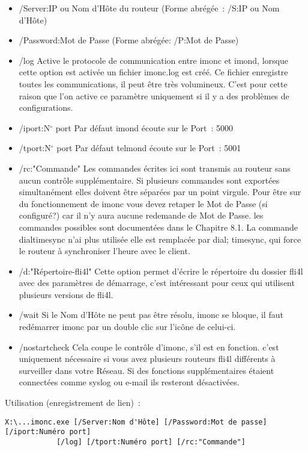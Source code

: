   \begin{itemize}
    \item /Server:IP ou Nom d'Hôte du routeur (Forme abrégée~: /S:IP ou Nom d'Hôte)
    \item /Password:Mot de Passe (Forme abrégée: /P:Mot de Passe)
    \item /log Active le protocole de communication entre imonc et imond, lorsque
      cette option est activée un fichier imonc.log est créé. Ce fichier enregistre
      toutes les communications, il peut être très volumineux. C'est pour cette
      raison que l'on active ce paramètre uniquement si il y a des problèmes de
      configurations.
    \item /iport:N$^\circ$ port Par défaut imond écoute sur le Port~: 5000
    \item /tport:N$^\circ$ port Par défaut telmond écoute sur le Port~: 5001
    \item /rc:"Commande" Les commandes écrites ici sont transmis au routeur sans
      aucun contrôle supplémentaire. Si plusieurs commandes sont exportées
      simultanément elles doivent être séparées par un point virgule. Pour être
      sur du fonctionnement de imonc vous devez retaper le Mot de Passe
      (si configuré?) car il n'y aura aucune redemande de Mot de Passe.
      les commandes possibles sont documentées dans le Chapitre 8.1. La commande
      dialtimesync n'ai plus utilisée elle est remplacée par \flqq{}dial; timesync\frqq{},
      qui force le routeur à synchroniser l'heure avec le client.
    \item /d:"Répertoire-fli4l" Cette option permet d'écrire le répertoire du
      dossier fli4l avec des paramètres de démarrage, c'est intéressant pour ceux
      qui utilisent plusieurs versions de fli4l.
    \item /wait Si le Nom d'Hôte ne peut pas être résolu, imonc se bloque,
      il faut redémarrer imonc par un double clic sur l'icône de celui-ci.
    \item /nostartcheck Cela coupe le contrôle d'imonc, s'il est en fonction.
      c'est uniquement nécessaire si vous avez plusieurs routeurs fli4l différents
      à surveiller dans votre Réseau. Si des fonctions supplémentaires étaient
      connectées comme syslog ou e-mail ils resteront désactivées.
  \end{itemize}

  Utilisation (enregistrement de lien)~:

\begin{example}
\begin{verbatim}
X:\...imonc.exe [/Server:Nom d'Hôte] [/Password:Mot de passe] [/iport:Numéro port]
            [/log] [/tport:Numéro port] [/rc:"Commande"]
\end{verbatim}
\end{example}

